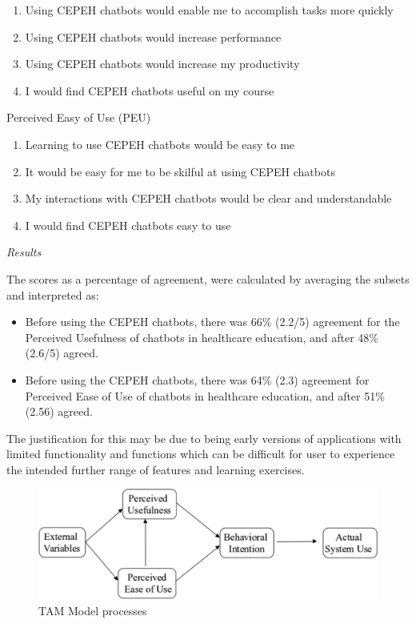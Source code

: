 \documentclass[a4paper, nobind]{templates/ociamthesis}
\providecommand{\tightlist}{%
  \setlength{\itemsep}{0pt}\setlength{\parskip}{0pt}}
\begin{document}
\begin{enumerate}
\def\labelenumi{\arabic{enumi}.}
\tightlist
\item
  Using CEPEH chatbots would enable me to accomplish tasks more
  quickly
\item
  Using CEPEH chatbots would increase performance
\item
  Using CEPEH chatbots would increase my productivity
\item
  I would find CEPEH chatbots useful on my course
\end{enumerate}

Perceived Easy of Use (PEU)

\begin{enumerate}
\def\labelenumi{\arabic{enumi}.}
\setcounter{enumi}{4}
\item
  Learning to use CEPEH chatbots would be easy to me
\item
  It would be easy for me to be skilful at using CEPEH chatbots
\item
  My interactions with CEPEH chatbots would be clear and
  understandable
\item
  I would find CEPEH chatbots easy to use
\end{enumerate}

\emph{Results}

The scores as a percentage of agreement, were calculated by averaging
the subsets and interpreted as:

\begin{itemize}
\item
  Before using the CEPEH chatbots, there was 66\% (2.2/5) agreement for
  the Perceived Usefulness of chatbots in healthcare education, and
  after 48\% (2.6/5) agreed.
\item
  Before using the CEPEH chatbots, there was 64\% (2.3) agreement for
  Perceived Ease of Use of chatbots in healthcare education, and after
  51\% (2.56) agreed.
\end{itemize}

The justification for this may be due to being early versions of
applications with limited functionality and functions which can be
difficult for user to experience the intended further range of features
and learning exercises.

\begin{figure}

{\centering \includegraphics[width=0.75\linewidth]{tam1} 

}

\caption{TAM Model processes}\label{fig:tam}
\end{figure}
\end{document}
